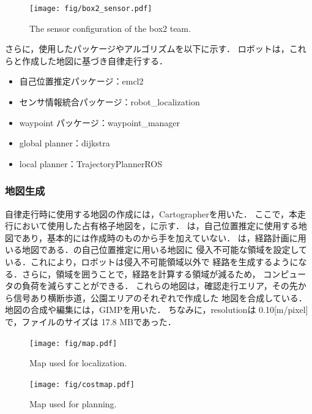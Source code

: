 \documentclass[twocolumn, 9pt]{jsproceedings}
\begin{document}
\begin{figure}[h!]
  \centering
  \texttt{[image: fig/box2\_sensor.pdf]}
  \caption{The sensor configuration of the box2 team.}
  \label{fig:box2-sensor}
\end{figure}


さらに，使用したパッケージやアルゴリズムを以下に示す．
ロボットは，これらと作成した地図に基づき自律走行する．

\begin{itemize}
  \item 自己位置推定パッケージ：emcl2\cite{emcl2}
  \item センサ情報統合パッケージ：robot\_localization\cite{robotlocalization}
  \item waypoint パッケージ：waypoint\_manager\cite{waypoint}
  \item global planner：dijkstra
  \item local planner：TrajectoryPlannerROS
\end{itemize}


\subsubsection{地図生成}
自律走行時に使用する地図の作成には，Cartographer\cite{Cartographer}を用いた．
ここで，本走行において使用した占有格子地図を，に示す．
は，自己位置推定に使用する地図であり，基本的には作成時のものから手を加えていない．
は，経路計画に用いる地図である．の自己位置推定に用いる地図に
侵入不可能な領域を設定している．これにより，ロボットは侵入不可能領域以外で
経路を生成するようになる．さらに，領域を囲うことで，経路を計算する領域が減るため，
コンピュータの負荷を減らすことができる．
これらの地図は，確認走行エリア，その先から信号あり横断歩道，公園エリアのそれぞれで作成した
地図を合成している．地図の合成や編集には，GIMP\cite{gimp}を用いた．
ちなみに，resolutionは 0.10[m/pixel]で，ファイルのサイズは 17.8 MBであった．

\begin{figure}[h!]
  \centering
  \texttt{[image: fig/map.pdf]}
  \caption{Map used for localization.}
  \label{fig:map}
\end{figure}
\vspace*{-2mm}
\begin{figure}[h!]
  \centering
  \texttt{[image: fig/costmap.pdf]}
  \caption{Map used for planning.}
  \label{fig:costmap}
\end{figure}
\end{document}
